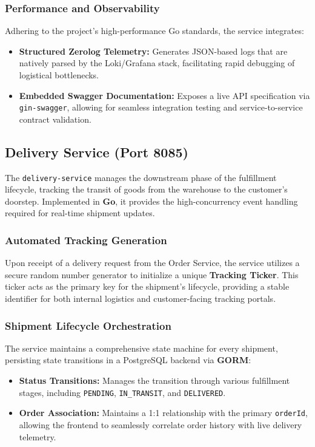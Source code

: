 \documentclass[12pt,a4paper]{report}
\begin{document}
\subsubsection{Performance and Observability}
Adhering to the project's high-performance Go standards, the service integrates:
\begin{itemize}
    \item \textbf{Structured Zerolog Telemetry:} Generates JSON-based logs that are natively parsed by the Loki/Grafana stack, facilitating rapid debugging of logistical bottlenecks.
    \item \textbf{Embedded Swagger Documentation:} Exposes a live API specification via \texttt{gin-swagger}, allowing for seamless integration testing and service-to-service contract validation.
\end{itemize}

\subsection{Delivery Service (Port 8085)}
The \texttt{delivery-service} manages the downstream phase of the fulfillment lifecycle, tracking the transit of goods from the warehouse to the customer's doorstep. Implemented in \textbf{Go}, it provides the high-concurrency event handling required for real-time shipment updates.

\subsubsection{Automated Tracking Generation}
Upon receipt of a delivery request from the Order Service, the service utilizes a secure random number generator to initialize a unique \textbf{Tracking Ticker}. This ticker acts as the primary key for the shipment's lifecycle, providing a stable identifier for both internal logistics and customer-facing tracking portals.

\subsubsection{Shipment Lifecycle Orchestration}
The service maintains a comprehensive state machine for every shipment, persisting state transitions in a PostgreSQL backend via \textbf{GORM}:
\begin{itemize}
    \item \textbf{Status Transitions:} Manages the transition through various fulfillment stages, including \texttt{PENDING}, \texttt{IN\_TRANSIT}, and \texttt{DELIVERED}.
    \item \textbf{Order Association:} Maintains a 1:1 relationship with the primary \texttt{orderId}, allowing the frontend to seamlessly correlate order history with live delivery telemetry.
\end{itemize}
\end{document}
